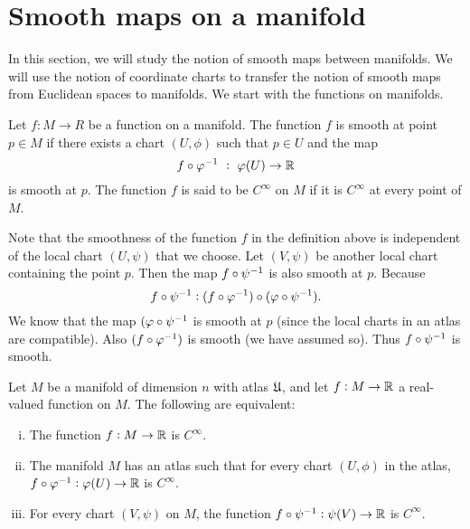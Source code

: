 \section{Smooth maps on a manifold}
In this section, we will study the notion of smooth maps between manifolds. We will use the notion of coordinate charts to transfer the notion of smooth maps from Euclidean spaces to manifolds. We start with the functions on manifolds.

\begin{definition}
	Let $ f:M \to R $ be a function on a manifold. The function $ f $ is smooth at point $ p \in M $ if there exists a chart $ (U,\phi) $ such that $ p \in U $ and the map
	\[ f \circ \varphi^{-1}\ :\ \varphi(U) \to \mathbb{R} \]
	is smooth at $ p $. The function $ f $ is said to be $ C^\infty $ on $ M $ if it is $ C^\infty $ at every point of $ M $.
\end{definition}
\begin{remark} 
	Note that the smoothness of the function $ f $ in the definition above is independent of the local chart $ (U,\psi) $ that we choose. Let $ (V,\psi) $ be another local chart containing the point $ p $. Then the map $ f \circ \psi^{-1} $ is also smooth at $ p $. Because
	\[ f \circ \psi^{-1}: (f\circ \varphi^{-1}) \circ (\varphi \circ \psi^{-1}). \]
	We know that the map $ (\varphi \circ \psi^{-1} $ is smooth at $ p $ (since the local charts in an atlas are compatible). Also $ (f\circ \varphi^{-1}) $ is smooth (we have assumed so). Thus $ f \circ \psi^{-1} $ is smooth.
\end{remark}

\begin{proposition}
	Let $ M $ be a manifold of dimension $ n $ with atlas $ \frak{U} $, and let $ f: M \to \mathbb{R} $ a real-valued function on $ M $. The following are equivalent:
	\begin{enumerate}[(i)]
		\item The function $ f : M \to \mathbb{R} $ is $ C^\infty $.
		\item The manifold $ M $ has an atlas such that for every chart $ (U,\phi) $ in the atlas, $ f\circ \varphi^{-1}: \varphi(U) \to \mathbb{R}$ is $ C^\infty $.
		\item For every chart $ (V,\psi) $ on $ M $, the function $ f\circ \psi^{-1}: \psi(V) \to \mathbb{R} $ is $ C^\infty $.
	\end{enumerate}
\end{proposition}

